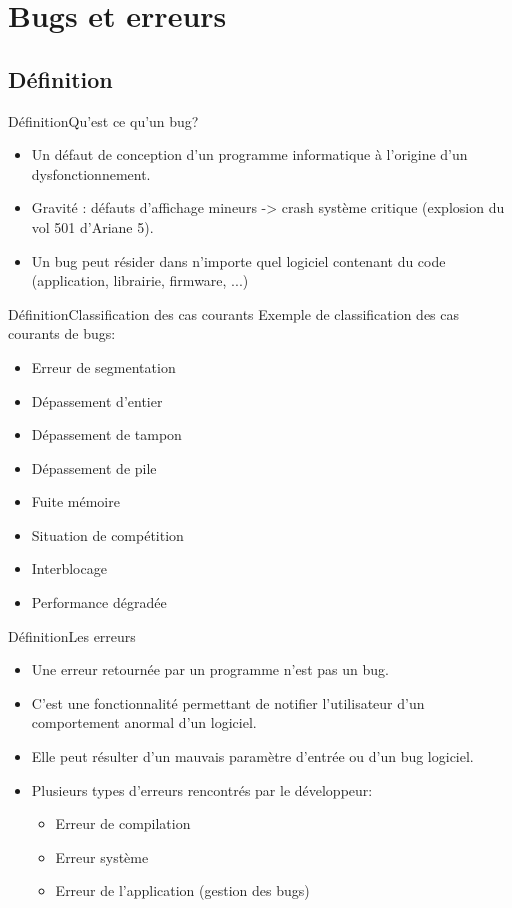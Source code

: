 \section{Bugs et erreurs}

\subsection{Définition}

\begin{frame}{Définition}{Qu'est ce qu'un bug?}
	\begin{itemize}
		\item
			Un défaut de conception d'un programme informatique à l'origine d'un dysfonctionnement.
		\item
			Gravité : défauts d’affichage mineurs -> crash système critique (explosion du vol 501 d'Ariane 5).
		\item
			Un bug peut résider dans n'importe quel logiciel contenant du code (application, librairie, firmware, ...)
	\end{itemize}	
\end{frame}

\begin{frame}{Définition}{Classification des cas courants}
	Exemple de classification des cas courants de bugs:
	\begin{itemize}
		\item
			Erreur de segmentation
		\item
			Dépassement d'entier
		\item
			Dépassement de tampon
		\item
			Dépassement de pile
		\item
			Fuite mémoire
		\item
			Situation de compétition
		\item
			Interblocage
		\pause
		\item
			Performance dégradée
	\end{itemize}
\end{frame}

\begin{frame}{Définition}{Les erreurs}
	\begin{itemize}
		\item
			Une erreur retournée par un programme n'est pas un bug.
		\item
			C'est une fonctionnalité permettant de notifier l'utilisateur d'un comportement anormal d'un logiciel. 
		\item
			Elle peut résulter d'un mauvais paramètre d'entrée ou d'un bug logiciel.
		\item
			Plusieurs types d'erreurs rencontrés par le développeur:
			\begin{itemize}
				\item
					Erreur de compilation
				\item
					Erreur système
				\item
					Erreur de l'application (gestion des bugs)
			\end{itemize}
	\end{itemize}
\end{frame}



